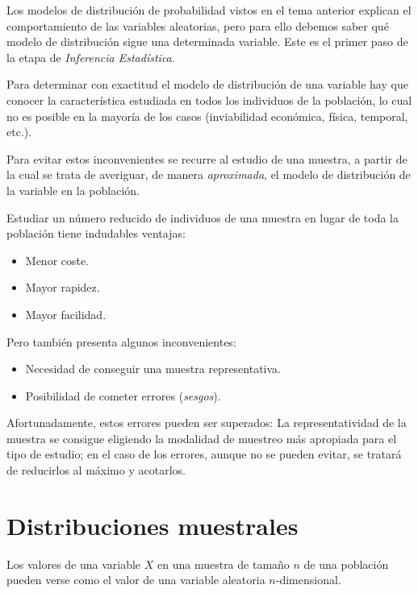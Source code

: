 \documentclass[
  spanish,
  a4paper,
]{scrreport}
\providecommand{\tightlist}{%
  \setlength{\itemsep}{0pt}\setlength{\parskip}{0pt}}
\theoremstyle{plain}
\theoremstyle{definition}
\theoremstyle{definition}
\theoremstyle{remark}
\begin{document}
Los modelos de distribución de probabilidad vistos en el tema anterior
explican el comportamiento de las variables aleatorias, pero para ello
debemos saber qué modelo de distribución sigue una determinada variable.
Este es el primer paso de la etapa de \emph{Inferencia Estadística}.

Para determinar con exactitud el modelo de distribución de una variable
hay que conocer la característica estudiada en todos los individuos de
la población, lo cual no es posible en la mayoría de los casos
(inviabilidad económica, física, temporal, etc.).

Para evitar estos inconvenientes se recurre al estudio de una muestra, a
partir de la cual se trata de averiguar, de manera \emph{aproximada}, el
modelo de distribución de la variable en la población.

Estudiar un número reducido de individuos de una muestra en lugar de
toda la población tiene indudables ventajas:

\begin{itemize}
\tightlist
\item
  Menor coste.
\item
  Mayor rapidez.
\item
  Mayor facilidad.
\end{itemize}

Pero también presenta algunos inconvenientes:

\begin{itemize}
\tightlist
\item
  Necesidad de conseguir una muestra representativa.
\item
  Posibilidad de cometer errores (\emph{sesgos}).
\end{itemize}

Afortunadamente, estos errores pueden ser superados: La
representatividad de la muestra se consigue eligiendo la modalidad de
muestreo más apropiada para el tipo de estudio; en el caso de los
errores, aunque no se pueden evitar, se tratará de reducirlos al máximo
y acotarlos.

\section{Distribuciones muestrales}\label{distribuciones-muestrales}

Los valores de una variable \(X\) en una muestra de tamaño \(n\) de una
población pueden verse como el valor de una variable aleatoria
\(n\)-dimensional.
\end{document}
